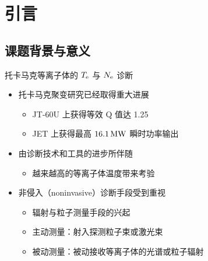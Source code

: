 \section{引言}

\subsection{课题背景与意义}

\begin{frame}{托卡马克等离子体的 $T_{\rm e}$ 与 $N_{\rm e}$ 诊断}
    \begin{itemize}
      \item 托卡马克聚变研究已经取得重大进展
        \begin{itemize}
          \item JT-60U 上获得等效 Q 值达 1.25 
          \item JET 上获得最高 $16.1\,{\rm MW}$ 瞬时功率输出 
        \end{itemize}
      \bigskip
      \item 由诊断技术和工具的进步所伴随
        \begin{itemize}
          \item 越来越高的等离子体温度带来考验
        \end{itemize}
      \bigskip
      \item 非侵入（noninvasive）诊断手段受到重视
        \begin{itemize}
          \item 辐射与粒子测量手段的兴起
          \item 主动测量：射入探测粒子束或激光束
          \item 被动测量：被动接收等离子体的光谱或粒子辐射
        \end{itemize}
    \end{itemize}
%    	
%    	
%    	
\end{frame}


